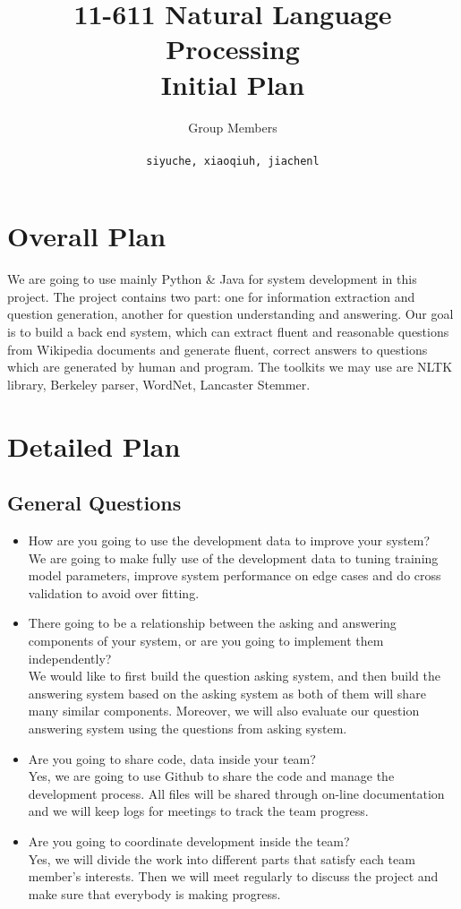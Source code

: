 \documentclass[a4page]{article}
\author{Group Members \\ \text{Siyu Chen, Xiaoqiu Huang, Jiachen Li} \\ \texttt{siyuche, xiaoqiuh, jiachenl}
}
\title{11-611 Natural Language Processing \\ Initial Plan}
\date{}
\begin{document}
\maketitle


\section{Overall Plan}
We are going to use mainly Python \& Java for system development in this project. The project contains two part: one for information extraction and question generation, another for question understanding and answering.
Our goal is to build a back end system, which can extract fluent and reasonable questions from Wikipedia documents and generate fluent, correct answers to questions which are generated by human and program.
The toolkits we may use are NLTK library, Berkeley parser, WordNet, Lancaster Stemmer.

\section{Detailed Plan}
\subsection{General Questions}
\begin{itemize}
\item How are you going to use the development data to improve your system?
\\We are going to make fully use of the development data to tuning training model parameters, improve system performance on edge cases and do cross validation to avoid over fitting.

\item There going to be a relationship between the asking and answering components of your system, or are you going to implement them independently?\\
We would like to first build the question asking system, and then build the answering system based on the asking system as both of them will share many similar components. Moreover, we will also evaluate our question answering system using the questions from asking system.

\item Are you going to share code, data inside your team?
\\Yes, we are going to use Github to share the code and manage the development process. All files will be shared through on-line documentation and we will keep logs for meetings to track the team progress.

\item Are you going to coordinate development inside the team? \\
Yes, we will divide the work into different parts that satisfy each team member's interests. Then we will meet regularly to discuss the project and make sure that everybody is making progress.

\end{itemize}
\end{document}
